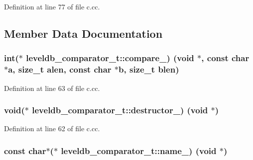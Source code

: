 Definition at line 77 of file c.\+cc.



\subsection{Member Data Documentation}
\hypertarget{structleveldb__comparator__t_a55906beb72b9f3502c941c16c1187719}{}
\subsubsection[{compare\+\_\+}]{\setlength{\rightskip}{0pt plus 5cm}int($\ast$ leveldb\+\_\+comparator\+\_\+t\+::compare\+\_\+) (void $\ast$, const char $\ast$a, size\+\_\+t alen, const char $\ast$b, size\+\_\+t blen)}\label{structleveldb__comparator__t_a55906beb72b9f3502c941c16c1187719}


Definition at line 63 of file c.\+cc.

\hypertarget{structleveldb__comparator__t_a757b51457e991ab2219fd5931426bb29}{}
\subsubsection[{destructor\+\_\+}]{\setlength{\rightskip}{0pt plus 5cm}void($\ast$ leveldb\+\_\+comparator\+\_\+t\+::destructor\+\_\+) (void $\ast$)}\label{structleveldb__comparator__t_a757b51457e991ab2219fd5931426bb29}


Definition at line 62 of file c.\+cc.

\hypertarget{structleveldb__comparator__t_a0ed64d60a3e077ed065d745fb6bdee15}{}
\subsubsection[{name\+\_\+}]{\setlength{\rightskip}{0pt plus 5cm}const char$\ast$($\ast$ leveldb\+\_\+comparator\+\_\+t\+::name\+\_\+) (void $\ast$)}\label{structleveldb__comparator__t_a0ed64d60a3e077ed065d745fb6bdee15}


